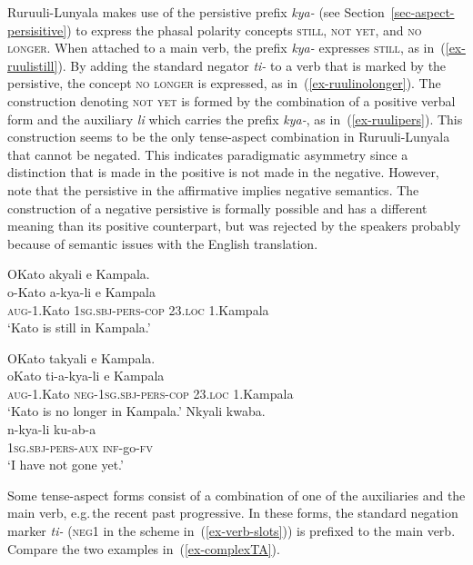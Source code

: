 Ruruuli-Lunyala makes use of the persistive prefix \textit{kya-} (see Section~\ref{sec-aspect-persisitive}) to express the phasal polarity concepts \textsc{still}, \textsc{not yet}, and \textsc{no longer}. 
When attached to a main verb, the prefix \textit{kya-} expresses \textsc{still}, as in~(\ref{ex-ruulistill}). 
By adding the standard negator \textit{ti-} to a verb that is marked by the persistive, the concept \textsc{no longer} is expressed, as in~(\ref{ex-ruulinolonger}). 
The construction denoting \textsc{not yet} is formed by the combination of a positive verbal form and the auxiliary \textit{li} which carries the prefix \textit{kya-}, as in~(\ref{ex-ruulipers}).  
This construction seems to be the only tense-aspect combination in Ru\-ruu\-li\hyp{}Lu\-nya\-la that cannot be negated. 
This indicates paradigmatic asymmetry since a distinction that is made in the positive is not made in the negative. 
However, note that the persistive in the affirmative implies negative semantics. 
The construction of a negative persistive is formally possible and has a different meaning than its positive counterpart, but was rejected by the speakers probably because of semantic issues with the English translation.

\ea 
\label{ex-ruulistandardpersistive}
\begin{xlist}
	\ex \label{ex-ruulistill}
	\glll  OKato akyali e Kampala.\\
		o-Kato a-kya-li e Kampala\\
		\textsc{aug}-1.Kato \textsc{1sg.sbj}-\textsc{pers}-\textsc{cop} 23.\textsc{loc} 1.Kampala\\
\glt ‘Kato is still in Kampala.’ 

\ex \label{ex-ruulinolonger}
	\glll OKato takyali e Kampala.\\
	 oKato ti-a-kya-li e Kampala\\
		\textsc{aug}-1.Kato \textsc{neg}-\textsc{1sg.sbj}-\textsc{pers}-\textsc{cop} 23.\textsc{loc} 1.Kampala\\
\glt ‘Kato is no longer in Kampala.’ 
	\ex \label{ex-ruulipers}
	\glll  Nkyali kwaba. \\
	n-kya-li ku-ab-a\\
		\textsc{1sg.sbj}-\textsc{pers}-\textsc{aux} \textsc{inf}-go-\textsc{fv}\\
\glt ‘I have not gone yet.’  	
\end{xlist}
\z

Some tense-aspect forms consist of a combination of one of the auxiliaries and the main verb, e.g.\,the recent past progressive. 
In these forms, the standard negation marker \textit{ti-} (\textsc{neg1} in the scheme in~(\ref{ex-verb-slots})) is prefixed to the main verb. 
Compare the two examples in~(\ref{ex-complexTA}). 

